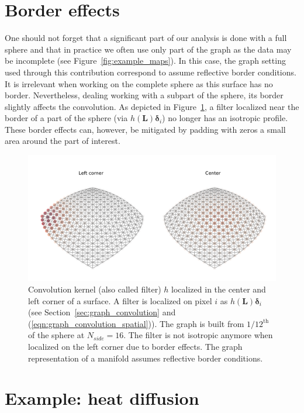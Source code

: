 \documentclass[final,twocolumn,3p,times,authoryear]{elsarticle}
\newcommand{\figref}[1]{Figure~\ref{fig:#1}}
\newcommand{\secref}[1]{Section~\ref{sec:#1}}
\newcommand{\eqnref}[1]{(\ref{eqn:#1})}
\renewcommand{\b}[1]{{\bm{#1}}}   %
\newcommand{\1}{\b{1}}              %
\newcommand{\0}{\b{0}}              %
\renewcommand{\L}{\b{L}}
\begin{document}
\section{Border effects}
\label{sec:border_effects}

One should not forget that a significant part of our analysis is done with a full sphere and that in practice we often use only part of the graph as the data may be incomplete (see \figref{example_maps}). 
In this case, the graph setting used through this contribution correspond to assume reflective border conditions.
It is irrelevant when working on the complete sphere as this surface has no border. Nevertheless, dealing working with a subpart of the sphere, its border slightly affects the convolution. 
As depicted in \figref{border_effects}, a filter localized near the border of a part of the sphere (via $h(\L) \b \delta_i$) no longer has an isotropic profile. 
These border effects can, however, be mitigated by padding with zeros a small area around the part of interest.

\begin{figure}
	\centering
	\includegraphics[width=\linewidth]{border_effects}
	\caption{Convolution kernel (also called filter) $h$ localized in the center and left corner of a surface. A filter is localized on pixel $i$ as $h(\L) \b \delta_i$ (see \secref{graph_convolution} and \eqnref{graph_convolution_spatial}). The graph is built from $1/12^\text{th}$ of the sphere at $N_{side} = 16$. The filter is not isotropic anymore when localized on the left corner due to border effects. The graph representation of a manifold assumes reflective border conditions.}
	\label{fig:border_effects}
\end{figure}

\section{Example: heat diffusion}
\label{sec:heat_diffusion}
\label{sec:filter_visualization}
\end{document}
